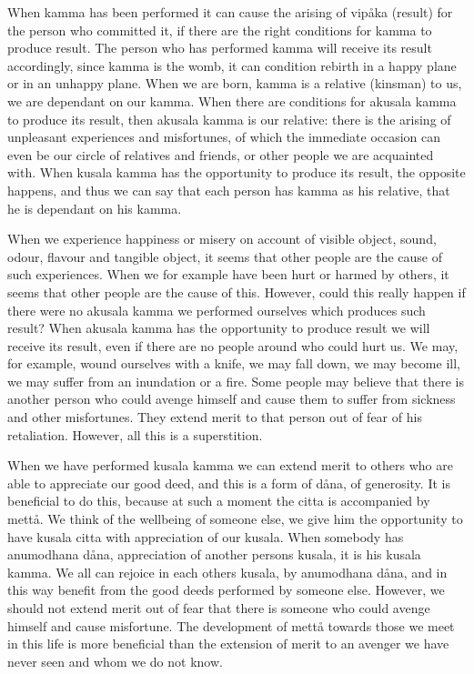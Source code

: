 \documentclass[12pt,twoside]{article}
\begin{document}
When kamma has been performed it can cause the arising of vip{\aa}ka
(result) for the person who committed it, if there are the right
conditions for kamma to produce result. The person who has performed
kamma will receive its result accordingly, since kamma is the
{\textasciigrave}{\textasciigrave}womb{\textquotesingle}{\textquotesingle},
it can condition rebirth in a happy plane or in an unhappy plane. When
we are born, kamma is a
{\textasciigrave}{\textasciigrave}relative{\textquotesingle}{\textquotesingle}
(kinsman) to us, we are dependant on our kamma. When there are
conditions for akusala kamma to produce its result, then akusala kamma
is our
{\textasciigrave}{\textasciigrave}relative{\textquotesingle}{\textquotesingle}:
there is the arising of unpleasant experiences and misfortunes, of
which the immediate occasion can even be our circle of relatives and
friends, or other people we are acquainted with. When kusala kamma has
the opportunity to produce its result, the opposite happens, and thus
we can say that each person has kamma as his relative, that he is
dependant on his kamma. 

When we experience happiness or misery on account of visible object,
sound, odour, flavour and tangible object, it seems that other people
are the cause of such experiences. When we for example have been hurt
or harmed by others, it seems that other people are the cause of this.
However, could this really happen if there were no akusala kamma we
performed ourselves which produces such result? When akusala kamma has
the opportunity to produce result we will receive its result, even if
there are no people around who could hurt us. We may, for example,
wound ourselves with a knife, we may fall down, we may become ill, we
may suffer from an inundation or a fire. Some people may believe that
there is another person who could avenge himself and cause them to
suffer from sickness and other misfortunes. They extend merit to that
person out of fear of his retaliation. However, all this is a
superstition. 

When we have performed kusala kamma we can extend merit to others who
are able to appreciate our good deed, and this is a form of d{\aa}na,
of generosity. It is beneficial to do this, because at such a moment
the citta is accompanied by mett{\aa}. We think of the wellbeing of
someone else, we give him the opportunity to have kusala citta with
appreciation of our kusala. When somebody has
{\textasciigrave}{\textasciigrave}anumodhana
d{\aa}na{\textquotesingle}{\textquotesingle}, appreciation of another
person{\textquotesingle}s kusala, it is his kusala kamma. We all can
rejoice in each others kusala, by anumodhana d{\aa}na, and in this way
benefit from the good deeds performed by someone else. However, we
should not extend merit out of fear that there is someone who could
avenge himself and cause misfortune. The development of mett{\aa}
towards those we meet in this life is more beneficial than the
extension of merit to an avenger we have never seen and whom we do not
know. 
\end{document}
